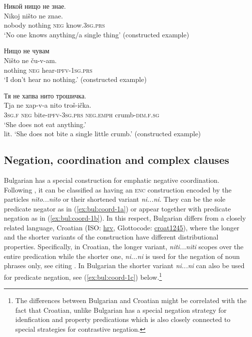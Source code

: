 \documentclass[output=paper,colorlinks=true, citecolor=brown]{langscibook}
\begin{document}
\z \z

\ea \label{ex:bul:reinf-2}
\ea Никой нищо не знае.\\ \label{ex:bul:reinf-2a}
  	\gll Nikoj ništo ne znae.\\
     nobody nothing \textsc{neg} know.\textsc{3sg.prs}\\
\glt `No one knows anything/a single thing' (constructed example) 


\ex Нищо не чувам \\ \label{ex:bul:reinf-2b}
  	\gll Ništo ne ču-v-am.\\
     nothing \textsc{neg} hear-\textsc{ipfv}-\textsc{1sg.prs} \\
\glt `I don't hear no nothing.' (constructed example) 
\z \z

\newpage
\ea Тя не хапва нито трошичка.\\ \label{ex:bul:reinf-3}
  	\gll Tja ne xap-v-a nito troš-ička.\\
     \textsc{3sg.f} \textsc{neg} bite-\textsc{ipfv}-\textsc{3sg.prs} \textsc{neg.emph} crumb-\textsc{dim.f.sg}\\
\glt `She does not eat anything.'\\
lit. `She does not bite a single little crumb.' (constructed example) 

\z

\subsection{Negation, coordination and complex clauses} \label{sec:bul:coord}
Bulgarian has a special construction for emphatic negative coordination. Following \citet[664, in passim]{Salaberri2022}, it can be classified as having an \textsc{enc} construction encoded by the particles \textit{nito...nito} or their shortened variant \textit{ni...ni}. They can be the sole predicate negator as in (\ref{ex:bul:coord-1a}) or appear together with predicate negation as in (\ref{ex:bul:coord-1b}). In this respect, Bulgarian differs from a closely related language, Croatian (ISO: \href{https://iso639-3.sil.org/code/hrv}{hrv}, Glottocode: \href{https://glottolog.org/resource/languoid/id/croat1245}{croat1245}), where the longer and the shorter variants of the construction have different distributional properties. Specifically, in Croatian, the longer variant, \textit{niti...niti} scopes over the entire predication while the shorter one, \textit{ni...ni} is used for the negation of noun phrases only, see \citet[670]{Salaberri2022} citing \citet{AuweraKrasnoukhova2020}. In Bulgarian the shorter variant \textit{ni...ni} can also be used for predicate negation, see (\ref{ex:bul:coord-1c}) below.\footnote{The differences between Bulgarian and Croatian might be correlated with the fact that Croatian, unlike Bulgarian has a special negation strategy for idenfication and property predications which is also closely connected to special strategies for contrastive negation.}
\end{document}
